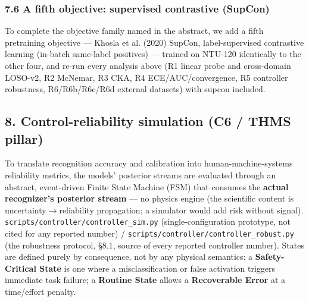 \subsubsection{7.6 A fifth objective: supervised contrastive (SupCon)}
To complete the objective family named in the abstract, we add a fifth pretraining objective --- Khosla et al. (2020) SupCon, label-supervised contrastive learning (in-batch same-label positives) --- trained on NTU-120 identically to the other four, and re-run every analysis above (R1 linear probe and cross-domain LOSO-v2, R2 McNemar, R3 CKA, R4 ECE/AUC/convergence, R5 controller robustness, R6/R6b/R6c/R6d external datasets) with supcon included.

\subsection{8. Control-reliability simulation (C6 / THMS pillar)}

To translate recognition accuracy and calibration into human-machine-systems reliability metrics, the models' posterior streams are evaluated through an abstract, event-driven Finite State Machine (FSM) that consumes the \textbf{actual recognizer's posterior stream} --- no physics engine (the scientific content is uncertainty$\rightarrow$reliability propagation; a simulator would add risk without signal). \texttt{scripts/controller/controller\_sim.py} (single-configuration prototype, not cited for any reported number) / \texttt{scripts/controller/controller\_robust.py} (the robustness protocol, \S{}8.1, source of every reported controller number). States are defined purely by consequence, not by any physical semantics: a \textbf{Safety-Critical State} is one where a misclassification or false activation triggers immediate task failure; a \textbf{Routine State} allows a \textbf{Recoverable Error} at a time/effort penalty.

